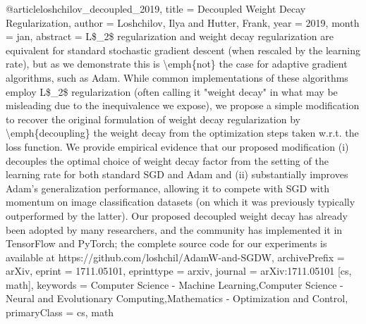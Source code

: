 
@article{loshchilov_decoupled_2019,
  title = {Decoupled {{Weight Decay Regularization}}},
  author = {Loshchilov, Ilya and Hutter, Frank},
  year = {2019},
  month = jan,
  abstract = {L\$\_2\$ regularization and weight decay regularization are equivalent for standard stochastic gradient descent (when rescaled by the learning rate), but as we demonstrate this is \textbackslash emph\{not\} the case for adaptive gradient algorithms, such as Adam. While common implementations of these algorithms employ L\$\_2\$ regularization (often calling it "weight decay" in what may be misleading due to the inequivalence we expose), we propose a simple modification to recover the original formulation of weight decay regularization by \textbackslash emph\{decoupling\} the weight decay from the optimization steps taken w.r.t. the loss function. We provide empirical evidence that our proposed modification (i) decouples the optimal choice of weight decay factor from the setting of the learning rate for both standard SGD and Adam and (ii) substantially improves Adam's generalization performance, allowing it to compete with SGD with momentum on image classification datasets (on which it was previously typically outperformed by the latter). Our proposed decoupled weight decay has already been adopted by many researchers, and the community has implemented it in TensorFlow and PyTorch; the complete source code for our experiments is available at https://github.com/loshchil/AdamW-and-SGDW},
  archivePrefix = {arXiv},
  eprint = {1711.05101},
  eprinttype = {arxiv},
  journal = {arXiv:1711.05101 [cs, math]},
  keywords = {Computer Science - Machine Learning,Computer Science - Neural and Evolutionary Computing,Mathematics - Optimization and Control},
  primaryClass = {cs, math}
}


